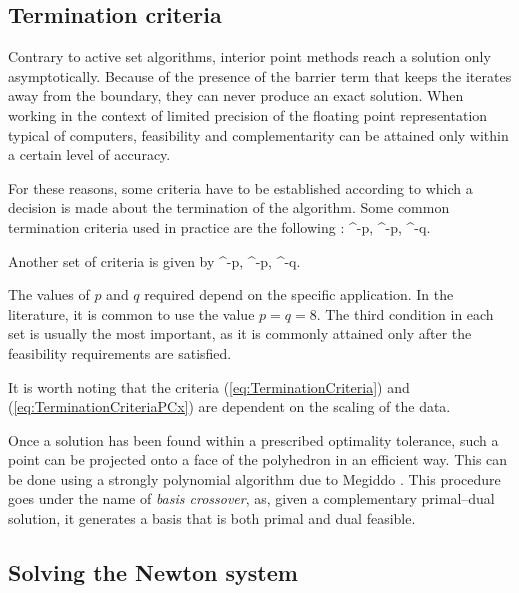 %
%
\subsection{Termination criteria}

Contrary to active set algorithms, interior point methods reach a
solution only asymptotically. 
Because of the presence of the barrier term that keeps the iterates
away from the boundary, they can never produce an exact solution.
When working in the context of limited precision of the
floating point representation typical of computers, feasibility and
complementarity can be attained only within a certain level
of accuracy.

For these reasons, some criteria have to be established according
to which a decision is made about the termination of the algorithm.
Some common termination criteria used in practice are the
following \cite{GondzioTerlaky}:
\be  \label{eq:TerminationCriteria}
  ^{-p}, 
\qquad
{}  ^{-p},
\qquad
{}  ^{-q}.
\ee

Another set of criteria is given by
\be  \label{eq:TerminationCriteriaPCx}
 ^{-p},
\qquad
{} ^{-p},
\qquad
{} ^{-q}.
\ee

The values of $p$ and $q$ required depend on the specific application.
In the literature, it is common to use the value $p = q = 8$.
The third condition in each set is usually the most important, as it is
commonly attained only after the feasibility requirements are satisfied.

It is worth noting that the criteria (\ref{eq:TerminationCriteria})
and (\ref{eq:TerminationCriteriaPCx})
are dependent on the scaling of the data.

Once a solution has been found within a prescribed 
optimality tolerance, such a point can be projected onto a face 
of the polyhedron in an efficient way.
This can be done using a strongly polynomial algorithm due
to Megiddo \cite{Megiddo91}. This procedure goes under the name
of {\em basis crossover}, 
as, given a complementary primal--dual solution, it generates a basis 
that is both primal and dual feasible.

%
%
\subsection{Solving the Newton system}
\label{sec:SolvingNewtonSystem}

